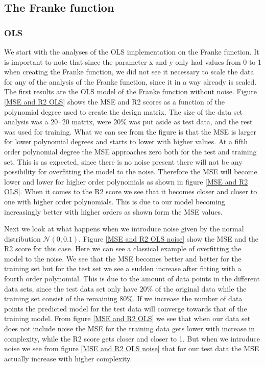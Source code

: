 \subsection{The Franke function}
\subsubsection{OLS}
\noindent We start with the analyses of the OLS implementation on the Franke function. It is important to note that since the parameter x and y only had values from 0 to 1 when creating the Franke function, we did not see it necessary to scale the data for any of the analysis of the Franke function, since it in a way already is scaled. The first results are the OLS model of the Franke function without noise. Figure \eqref{MSE and R2 OLS} shows the MSE and R2 scores as a function of the polynomial degree used to create the design matrix. The size of the data set analysis was a $20 \cdot 20$ matrix, were $20\%$ was put aside as test data, and the rest was used for training. What we can see from the figure is that the MSE is larger for lower polynomial degrees and starts to lower with higher values. At a fifth order polynomial degree the MSE approaches zero both for the test and training set. This is as expected, since there is no noise present there will not be any possibility for overfitting the model to the noise. Therefore the MSE will become lower and lower for higher order polynomials as shown in figure \eqref{MSE and R2 OLS}. When it comes to the R2 score we see that it becomes closer and closer to one with higher order polynomials. This is due to our model becoming increasingly better with higher orders as shown form the MSE values.

\noindent Next we look at what happens when we introduce noise given by the normal distribution $\mathcal{N}(0,0.1)$. Figure \eqref{MSE and R2 OLS noise} show the MSE and the R2 score for this case. Here we can see a classical example of overfitting the model to the noise. We see that the MSE becomes better and better for the training set but for the test set we see a sudden increase after fitting with a fourth order polynomial. This is due to the amount of data points in the different data sets, since the test data set only have $20\%$ of the original data while the training set consist of the remaining $80\%$. If we increase the number of data points the predicted model for the test data will converge towards that of the training model. 
\noindent From figure \eqref{MSE and R2 OLS} we see that when our data set does not include noise the MSE for the training data gets lower with increase in complexity, while the R2 score gets closer and closer to 1. But when we introduce noise we see from figure \eqref{MSE and R2 OLS noise} that for our test data the MSE actually increase with higher complexity. 

